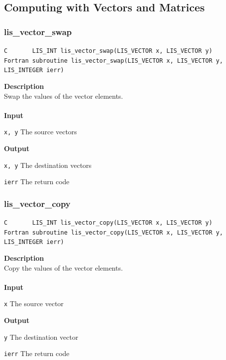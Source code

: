 \documentclass[a4paper]{article}
\newcommand{\namelistlabel}[1]{\mbox{#1}\hfill}
\newenvironment{namelist}[1]{%
\begin{list}{}
  {\let\makelabel\namelistlabel
  \settowidth{\labelwidth}{#1}
  \setlength{\leftmargin}{1.1\labelwidth}}
  }{%
\end{list}}
\begin{document}
\newpage
\subsection{Computing with Vectors and Matrices}
\subsubsection{lis\_vector\_swap}
\begin{screen}
\verb|C       LIS_INT lis_vector_swap(LIS_VECTOR x, LIS_VECTOR y)|\\
\verb|Fortran subroutine lis_vector_swap(LIS_VECTOR x, LIS_VECTOR y, LIS_INTEGER ierr)|
\end{screen}
{\bf Description}\\
\indent
Swap the values of the vector elements.
\\ \\
\noindent
{\bf Input}
\begin{namelist}{XXXXXXXXXXXXXXXXXXXX}
\item[\tt x, y] The source vectors
\end{namelist}
{\bf Output}
\begin{namelist}{XXXXXXXXXXXXXXXXXXXX}
\item[\tt x, y] The destination vectors
\item[\tt ierr] The return code
\end{namelist}

\subsubsection{lis\_vector\_copy}
\begin{screen}
\verb|C       LIS_INT lis_vector_copy(LIS_VECTOR x, LIS_VECTOR y)|\\
\verb|Fortran subroutine lis_vector_copy(LIS_VECTOR x, LIS_VECTOR y, LIS_INTEGER ierr)|
\end{screen}
{\bf Description}\\
\indent
Copy the values of the vector elements.
\\ \\
\noindent
{\bf Input}
\begin{namelist}{XXXXXXXXXXXXXXXXXXXX}
\item[\tt x] The source vector
\end{namelist}
{\bf Output}
\begin{namelist}{XXXXXXXXXXXXXXXXXXXX}
\item[\tt y] The destination vector
\item[\tt ierr] The return code
\end{namelist}
\end{document}
